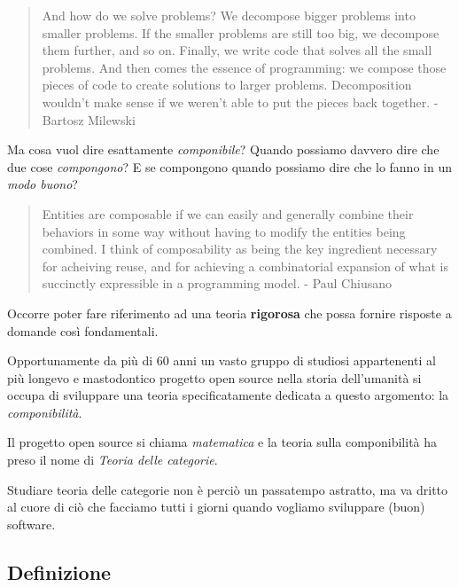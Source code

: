 \documentclass[12pt]{article}
\begin{document}
\begin{quote}
And how do we solve problems? We decompose bigger problems into smaller problems. If the smaller problems are still too big,
we decompose them further, and so on. Finally, we write code that solves all the small problems.
And then comes the essence of programming: we compose those pieces of code to create solutions to larger problems.
Decomposition wouldn’t make sense if we weren’t able to put the pieces back together. - Bartosz Milewski
\end{quote}

Ma cosa vuol dire esattamente \emph{componibile}? Quando possiamo davvero dire che due cose \emph{compongono}?
E se compongono quando possiamo dire che lo fanno in un \emph{modo buono}?\\

\begin{quote}
Entities are composable if we can easily and generally combine their behaviors in some way without having to modify the entities being combined.
I think of composability as being the key ingredient necessary for acheiving reuse, and for achieving a combinatorial expansion of
what is succinctly expressible in a programming model. - Paul Chiusano
\end{quote}

Occorre poter fare riferimento ad una teoria \textbf{rigorosa} che possa fornire risposte a domande così fondamentali.

Opportunamente da più di 60 anni un vasto gruppo di studiosi appartenenti al più longevo e mastodontico progetto open source nella storia
dell'umanità si occupa di sviluppare una teoria specificatamente dedicata a questo argomento: la \emph{componibilità}.

Il progetto open source si chiama \emph{matematica} e la teoria sulla componibilità ha preso il nome di \emph{Teoria delle categorie}.

Studiare teoria delle categorie non è perciò un passatempo astratto, ma va dritto al cuore di ciò che facciamo tutti i giorni quando vogliamo
sviluppare (buon) software.

\subsection{Definizione}
\end{document}
